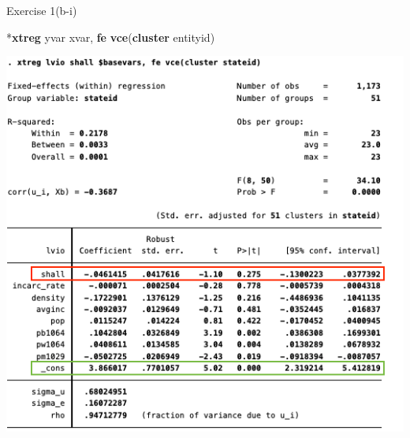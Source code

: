 \documentclass[
  10pt,
  ignorenonframetext,
]{beamer}
\newenvironment{Shaded}{\begin{snugshade}}{\end{snugshade}}
\newcommand{\KeywordTok}[1]{\textcolor[rgb]{0.13,0.29,0.53}{\textbf{#1}}}
\newcommand{\NormalTok}[1]{#1}
\begin{document}
\begin{frame}[fragile]{Exercise 1(b-i)}
\protect\hypertarget{Ex1-EntityFEs}{}
\footnotesize

\begin{Shaded}
\begin{Highlighting}[]
\NormalTok{*}\KeywordTok{xtreg}\NormalTok{ yvar xvar, }\KeywordTok{fe} \KeywordTok{vce}\NormalTok{(}\KeywordTok{cluster}\NormalTok{ entityid)}
\end{Highlighting}
\end{Shaded}

\begin{flushleft}\includegraphics[width=0.8\linewidth]{pictures/Ex1-EntityFEs} \end{flushleft}
\end{frame}
\end{document}

